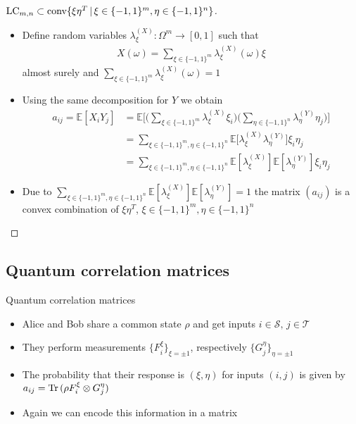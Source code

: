\begin{frame}
	\begin{proof}[$   \textup{LC}_{m,n}  \subset \textup{conv} \{  \xi\eta^T \, | \, \xi \in \{-1,1\}^m, \eta \in \{-1,1\}^n     \} $]
		\begin{itemize}
			\item<1-> {\footnotesize Define random variables $ \lambda_{\xi}^{(X)}: \Omega^m \to [0,1] $ such that 
			\begin{align*}
			X(\omega) = \sum_{\xi \in \{-1,1\}^m}\lambda_{\xi}^{(X)}(\omega)\xi
			\end{align*} 
			almost surely 
			and $ \sum_{\xi \in \{-1,1\}^m}\lambda_{\xi}^{(X)}(\omega) = 1  $}
			\item<1-> Using the same decomposition for $ Y $ we obtain 
			\begin{align*}
			a_{ij} = \mathbb{E}[X_iY_j] &= \mathbb{E} \big [ \big (\sum_{\xi \in \{-1,1\}^m}\lambda_{\xi}^{(X)}\xi_i \big  ) \big (\sum_{\eta \in \{-1,1\}^n}\lambda_{\eta}^{(Y)}\eta_j \big ) \big ]   \\
			&= \sum_{\xi \in \{-1,1\}^m, \eta \in \{-1,1\}^n} \mathbb{E}\big [\lambda_{\xi}^{(X)}\lambda_{\eta}^{(Y)} \big ] \xi_i \eta_j  \\
			&= \sum_{\xi \in \{-1,1\}^m, \eta \in \{-1,1\}^n}\mathbb{E} [\lambda_{\xi}^{(X)} ]\mathbb{E}[\lambda_{\eta}^{(Y)}]\xi_i\eta_j
			\end{align*}
			\item<2-> Due to $ \sum_{\xi \in \{-1,1\}^m, \eta \in \{-1,1\}^n}\mathbb{E} [\lambda_{\xi}^{(X)} ]\mathbb{E}[\lambda_{\eta}^{(Y)}] = 1 $
			the matrix $ (a_{ij}) $ is a convex combination of $ \xi \eta^T $, $ \xi \in \{-1,1\}^m, \eta \in \{-1,1 \}^n $
		\end{itemize}
	\end{proof}
\end{frame}



\subsection{Quantum correlation matrices}

\begin{frame}[label = QCMot]{Quantum correlation matrices}
	\begin{itemize}
		\item<1-> Alice and Bob share a common state $ \rho $ and get inputs $ i \in \mathcal{S}, \, j \in \mathcal{T} $ 
		\item<2-> They perform measurements $ \{ F_i^{\xi} \}_{\xi = \pm 1} $, respectively $ \{ G_j^{\eta} \}_{\eta = \pm 1} $
		\item <3-> The probability that their response is $ (\xi,\eta) $ for inputs $ (i,j) $ is given by 
		$ a_{ij} = \textup{Tr} \, {(\rho F_i^\xi \otimes G_j^\eta )}  $
		\item<4-> Again we can encode this information in a matrix
	\end{itemize}
	\hyperlink{LCMot}{}
\end{frame}

